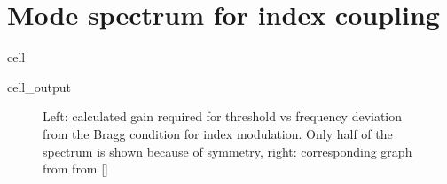 \documentclass[a4paper,10pt,english,openany,oneside]{jupyterBook}
\begin{document}
\section{Mode spectrum for index coupling}
\label{\detokenize{Kogelnik-Shank_Coupled-Wave-Theory_DFB-Lasers:mode-spectrum-for-index-coupling}}
\begin{sphinxuseclass}{cell}\begin{sphinxVerbatimOutput}

\begin{sphinxuseclass}{cell_output}
\begin{figure}[htbp]
\centering
\capstart

\noindent{}
\caption{Left: calculated gain required for threshold vs frequency deviation from the Bragg condition for index modulation.  Only half of the spectrum is shown because of symmetry, right: corresponding graph from from {[}{]}}\label{\detokenize{Kogelnik-Shank_Coupled-Wave-Theory_DFB-Lasers:kogelnik5c}}\end{figure}

\end{sphinxuseclass}\end{sphinxVerbatimOutput}

\end{sphinxuseclass}
\end{document}
